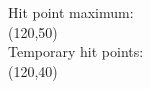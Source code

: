 {\small Hit point maximum: }\DndHitPoints\\
\framebox(120,50){}\\
{\small Temporary hit points:}\\
\framebox(120,40){}\\
